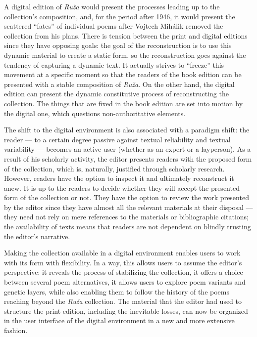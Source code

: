 \documentclass{article}
\begin{document}
A digital edition of \emph{Ruža} would present the processes leading up
to the collection's composition, and, for the period after 1946, it would
present the scattered ``fates'' of individual poems after Vojtech
Mihálik removed the collection from his plans. There is tension between
the print and digital editions since they have opposing goals: the goal
of the reconstruction is to use this dynamic material to create a static
form, so the reconstruction goes against the tendency of capturing
a dynamic text. It actually strives to ``freeze'' this movement at
a specific moment so that the readers of the book edition can be
presented with a stable composition of \emph{Ruža}. On the other hand,
the digital edition can present the dynamic constitutive process of
reconstructing the collection. The things that are fixed in the book
edition are set into motion by the digital one, which questions
non-authoritative elements.

The shift to the digital environment is also associated with a paradigm
shift: the reader –– to a certain degree passive against textual
reliability and textual variability –– becomes an active user (whether
as an expert or a layperson). As a result of his scholarly activity, the
editor presents readers with the proposed form of the collection, which
is, naturally, justified through scholarly research. However, readers
have the option to inspect it and ultimately reconstruct it anew. It is
up to the readers to decide whether they will accept the presented form
of the collection or not. They have the option to review the work
presented by the editor since they have almost all the relevant
materials at their disposal –– they need not rely on mere references to
the materials or bibliographic citations; the availability of texts
means that readers are not dependent on blindly trusting the editor's
narrative.

Making the collection available in a digital environment enables users
to work with its form with flexibility. In a way, this allows users to
assume the editor's perspective: it reveals the process of stabilizing
the collection, it offers a choice between several poem alternatives, it
allows users to explore poem variants and genetic layers, while also
enabling them to follow the history of the poems reaching beyond the
\emph{Ruža} collection. The material that the editor had used to
structure the print edition, including the inevitable losses, can now be
organized in the user interface of the digital environment in a new and
more extensive fashion.
\end{document}
